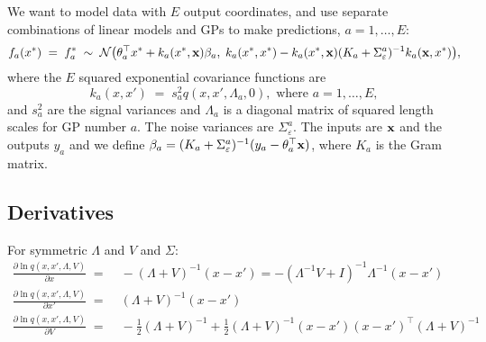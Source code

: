 \documentclass{article}
\newcommand{\inv}{^{-1}}
\newcommand{\bfx}{{\bf x}}
\begin{document}
%
We want to model data with $E$ output coordinates, and use separate
combinations of linear models and GPs to make predictions,
$a=1,\ldots,E$:
\[
f_a(x^*)\;=\;f_a^*\;\sim\;{\cal N}\big(\theta_a^\top x^*+k_a(x^*,\bfx)\beta_a,\;
k_a(x^*,x^*)-k_a(x^*,\bfx)(K_a+\Sigma_\varepsilon^a)^{-1}k_a(\bfx,x^*)\big),
\]
where the $E$ squared exponential covariance functions are
\begin{equation}
k_a(x,x')\;=\;s_a^2q(x, x',\Lambda_a,0), \text{\ \ where\ \ }a=1,\ldots,E,
\end{equation}
and $s_a^2$ are the signal variances and $\Lambda_a$ is a diagonal
matrix of squared length scales for GP number $a$. The noise variances
are $\Sigma_\varepsilon^a$. The inputs are $\bfx$ and the outputs
$y_a$ and we define $\beta_a=(K_a+\Sigma_\varepsilon^a)^{-1}(y_a-\theta_a^\top\bfx)$,
where $K_a$ is the Gram matrix.

\subsection{Derivatives}

For symmetric $\Lambda$ and $V$ and $\Sigma$:
\begin{equation}
\begin{split}
\frac{\partial \ln q(x,x',\Lambda,V)}{\partial x}
\;=&\; -(\Lambda+V)\inv (x-x') = -(\Lambda\inv V+I)\inv\Lambda\inv (x-x') \\
\frac{\partial \ln q(x,x',\Lambda,V)}{\partial x'}
\;=&\; (\Lambda+V)\inv (x-x') \\
\frac{\partial \ln q(x,x',\Lambda,V)}{\partial V}
\;=&\; -\frac{1}{2}(\Lambda+V)\inv + \frac{1}{2}(\Lambda+V)\inv(x-x')(x-x')^\top(\Lambda+V)\inv
\end{split}
\end{equation}
\end{document}
